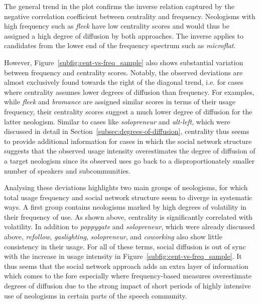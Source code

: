 \documentclass[
  a4paper,
  abstract=on,
  captions=tableabove,
  ]{scrartcl}
\newcommand{\ol}[1]{\emph{#1}}
\begin{document}
      The general trend in the plot confirms the inverse relation captured by the negative correlation coefficient between centrality and frequency. Neologisms with high frequency such as \ol{fleek} have low centrality scores and would thus be assigned a high degree of diffusion by both approaches. The inverse applies to candidates from the lower end of the frequency spectrum such as \ol{microflat}.

      However, Figure~\ref{subfig:cent-vs-freq_sample} also shows substantial variation between frequency and centrality scores. Notably, the observed deviations are almost exclusively found towards the right of the diagonal trend, i.e. for cases where centrality assumes lower degrees of diffusion than frequency. For examples, while \ol{fleek} and \ol{bromance} are assigned similar scores in terms of their usage frequency, their centrality scores suggest a much lower degree of diffusion for the latter neologism. Similar to cases like \ol{solopreneur} and \ol{alt-left}, which were discussed in detail in Section~\ref{subsec:degrees-of-diffusion}, centrality thus seems to provide additional information for cases in which the social network structure suggests that the observed usage intensity overestimates the degree of diffusion of a target neologism since its observed uses go back to a disproportionately smaller number of speakers and subcommunities.

      Analysing these deviations highlights two main groups of neologisms, for which total usage frequency and social network structure seem to diverge in systematic ways. A first group contains neologisms marked by high degrees of volatility in their frequency of use. As shown above, centrality is significantly correlated with volatility. In addition to \ol{poppygate} and \ol{solopreneur}, which were already discussed above, \ol{refollow}, \ol{gaslighting}, \ol{solopreneur}, and \ol{coworking} also show little consistency in their usage. For all of these terms, social diffusion is out of sync with the increase in usage intensity in Figure~\ref{subfig:cent-vs-freq_sample}. It thus seems that the social network approach adds an extra layer of information which comes to the fore especially where frequency-based measures overestimate degrees of diffusion due to the strong impact of short periods of highly intensive use of neologisms in certain parts of the speech community.
\end{document}
